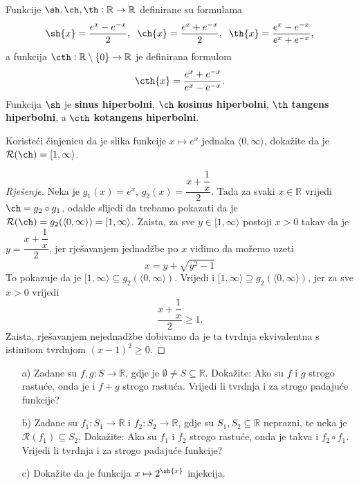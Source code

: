 \begin{definition}
Funkcije $\sh, \ch, \th : \mathbb{R}\to \mathbb{R}$ definirane su formulama
$$\sh{x}=\dfrac{e^x-e^{-x}}{2},\;\;\ch{x}=\dfrac{e^x+e^{-x}}{2},\;\; \th{x}=\dfrac{e^x-e^{-x}}{e^x+e^{-x}},$$
a funkcija $\cth : \mathbb{R}\setminus\{0\}\to \mathbb{R}$ je definirana formulom
$$\cth{x}=\dfrac{e^x+e^{-x}}{e^x-e^{-x}}.$$
Funkcija $\sh$ je \textbf{sinus hiperbolni}, $\ch$ \textbf{kosinus hiperbolni}, $\th$ \textbf{tangens hiperbolni}, a $\cth$ \textbf{kotangens hiperbolni}.
\end{definition}
\begin{exercise}
Koristeći činjenicu da je slika funkcije $x\mapsto e^x$ jednaka $\langle 0, \infty\rangle$, dokažite da je $\mathcal{R}(\ch)=[1,\infty\rangle$.
\end{exercise}
\begin{proof}[Rješenje]
Neka je $g_1(x)=e^x$, $g_2(x)=\dfrac{x+\dfrac{1}{x}}{2}$. Tada za svaki $x\in \mathbb{R}$ vrijedi $\ch=g_2\circ g_1$, odakle slijedi da trebamo pokazati da je $\mathcal{R}(\ch)=g_2(\langle 0, \infty\rangle)=[1, \infty\rangle$.
Zaista, za sve $y\in [1, \infty\rangle$ postoji $x>0$ takav da je $y=\dfrac{x+\dfrac{1}{x}}{2}$, jer rješavanjem jednadžbe po $x$ vidimo da možemo uzeti
$$x=y+\sqrt{y^2-1}$$
To pokazuje da je $[1, \infty\rangle \subseteq g_2(\langle 0, \infty\rangle)$. Vrijedi i $[1, \infty\rangle \supseteq g_2(\langle 0, \infty\rangle)$, jer za sve $x>0$ vrijedi $$\dfrac{x+\dfrac{1}{x}}{2}\geq 1.$$ Zaista, rješavanjem nejednadžbe dobivamo da je ta tvrdnja ekvivalentna s istinitom tvrdnjom $(x-1)^2\geq 0$.
\end{proof}
\begin{exercise} \textbf{}
\begin{itemize}
\item[a)] Zadane su $f, g : S\to \mathbb{R}$, gdje je $\emptyset\neq S\subseteq \mathbb{R}$. Dokažite: Ako su $f$ i $g$ strogo rastuće, onda je i $f+g$ strogo rastuća. Vrijedi li tvrdnja i za strogo padajuće funkcije? 
\item[b)] Zadane su $f_1 : S_1\to \mathbb{R}$ i $f_2 : S_2\to \mathbb{R}$, gdje su $S_1, S_2\subseteq \mathbb{R}$ neprazni, te neka je $\mathcal{R}(f_1)\subseteq S_2$. Dokažite: Ako su $f_1$ i $f_2$ strogo rastuće, onda je takva i $f_2\circ f_1$. Vrijedi li tvrdnja i za strogo padajuće funkcije?
\item[c)] Dokažite da je funkcija $x\mapsto 2^{\sh{x}}$ injekcija.
\end{itemize}
\end{exercise}
